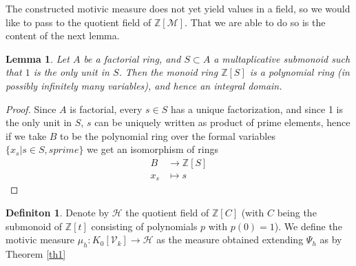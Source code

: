 \documentclass[11pt, a4paper, german]{article}
\theoremstyle{plain}
\newtheorem{lemma}[theorem]{Lemma}
\theoremstyle{definition}
\newtheorem{definition}[theorem]{Definiton}
\newcommand{\gring}[1][k]{K_0[\mathcal{V}_#1]}
\begin{document}
The constructed motivic measure does not yet yield values in a field, so we would like to pass to the quotient field of $\mathbb{Z}[\mathcal{M}]$.
That we are able to do so is the content of the next lemma.

\begin{lemma}
    Let $A$ be a factorial ring, and $S \subset A$ a multaplicative submonoid such that $1$ is the only unit in $S$. Then the monoid ring
    $\mathbb{Z}[S]$ is a polynomial ring (in possibly infinitely many variables), and hence an integral domain.
\end{lemma}
\begin{proof}
    Since $A$ is factorial, every $s \in S$ has a unique factorization, and since 1 is the only unit in $S$, 
    $s$ can be uniquely written as product of prime elements, hence if we take $B$ to be the polynomial ring over the formal
    variables $\{x_s | s \in S, s prime\}$ we get an isomorphism of rings
    \begin{align*}
        B &\to \mathbb{Z}[S] \\
        x_s &\mapsto s
    \end{align*}
\end{proof}

\begin{definition}
    Denote by $\mathcal{H}$ the quotient field of $\mathbb{Z}[C]$ (with $C$ being the submonoid of $\mathbb{Z}[t]$ consisting of polynomials 
    $p$ with $p(0) = 1$).
    We define the motivic measure $\mu_h \colon \gring \to \mathcal{H}$ as the measure obtained extending $\Psi_h$ as by Theorem \ref{th1}
\end{definition}
\end{document}
